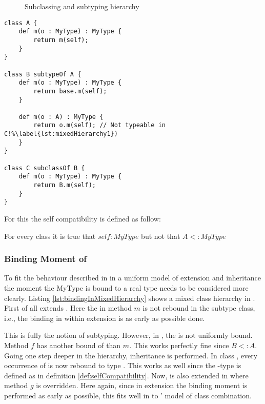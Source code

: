 \begin{figure}[ht]
	\centering
	\caption{Subclassing and subtyping hierarchy}
	\label{fig:hierarchy}
\end{figure}

\begin{lstlisting}[float,language=ooplss,caption=Mixed extension and inheritance hierarchy,label=lst:mixedHierarchy]
class A {
	def m(o : MyType) : MyType {
		return m(self);
	}
}

class B subtypeOf A {
	def m(o : MyType) : MyType {
		return base.m(self);
	}

	def m(o : A) : MyType { 
		return o.m(self); // Not typeable in C!%\label{lst:mixedHierarchy1})
	}
}

class C subclassOf B {
	def m(o : MyType) : MyType {
		return B.m(self);
	}
}
\end{lstlisting}

For this the self compatibility is defined as follow:

\begin{defn}
	\label{def:selfCompatibility}
	For every class \A it is true that $self : MyType$ but not that $A <: MyType$
\end{defn}

\subsubsection{Binding Moment of \mytype}
To fit the behaviour described in  in
a uniform model of extension and inheritance the moment the MyType is bound
to a real type
needs to be considered more clearly. Listing
\ref{lst:bindingInMixedHierarchy} shows a mixed class hierarchy in
\ooplss. First of all \B extends \A. Here the \mytype in method $m$ is
not rebound in the subtype class, i.e., the \mytype binding in within
extension is as early as possible done. 

This is fully the notion of
subtyping. However, in \B, the \mytype is not uniformly bound. Method $f$
has another bound of \mytype than $m$. This works perfectly fine
since $B <: A$. Going one step deeper in the hierarchy, inheritance is
performed. In class \C, every occurrence of \mytype is now rebound to
type \C. This works as well since the \self-type is defined as in definition
\ref{def:selfCompatibility}. Now, \C is also extended in \D where method
$g$ is overridden. Here again, since in extension the binding moment is
performed as early as possible, this fits well in to \ooplss' model of
class combination.

